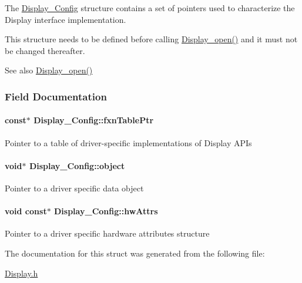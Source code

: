The \hyperlink{struct_display___config}{Display\+\_\+\+Config} structure contains a set of pointers used to characterize the Display interface implementation.

This structure needs to be defined before calling \hyperlink{_display_8h_a3aa87973a354d4fd6a2969f764e8afe6}{Display\+\_\+open()} and it must not be changed thereafter.

\begin{DoxySeeAlso}{See also}
\hyperlink{_display_8h_a3aa87973a354d4fd6a2969f764e8afe6}{Display\+\_\+open()} 
\end{DoxySeeAlso}


\subsubsection{Field Documentation}
\paragraph[{fxn\+Table\+Ptr}]{ const$\ast$ Display\+\_\+\+Config\+::fxn\+Table\+Ptr}\label{struct_display___config_adce10e2738107a8b017ac8df3dbe1d73}
Pointer to a table of driver-\/specific implementations of Display A\+P\+Is 
\paragraph[{object}]{\setlength{\rightskip}{0pt plus 5cm}void$\ast$ Display\+\_\+\+Config\+::object}\label{struct_display___config_a3888ffcab482aacee937ec782f49110d}
Pointer to a driver specific data object 
\paragraph[{hw\+Attrs}]{\setlength{\rightskip}{0pt plus 5cm}void const$\ast$ Display\+\_\+\+Config\+::hw\+Attrs}\label{struct_display___config_a5fe62abb9c875eca79144e916082ecb8}
Pointer to a driver specific hardware attributes structure 

The documentation for this struct was generated from the following file\+:\begin{DoxyCompactItemize}
\item 
\hyperlink{_display_8h}{Display.\+h}\end{DoxyCompactItemize}
